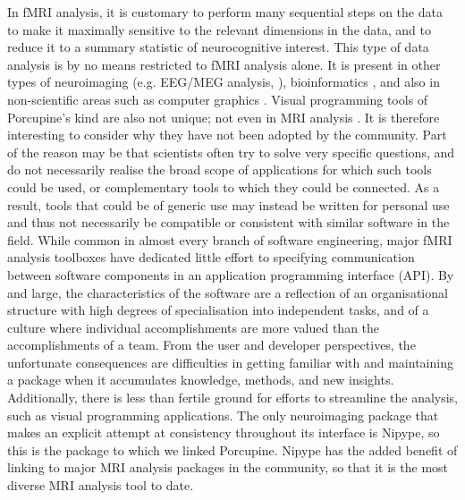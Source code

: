 In fMRI analysis, it is customary to perform many sequential steps on the data to make it maximally sensitive to the relevant dimensions in the data, and to reduce it to a summary statistic of neurocognitive interest. This type of data analysis is by no means restricted to fMRI analysis alone. It is present in other types of neuroimaging (e.g. EEG/MEG analysis, \cite{Oostenveld2011}), bioinformatics \cite{Wolstencroft2013}, and also in non-scientific areas such as computer graphics \cite{Blender}. Visual programming tools of Porcupine's kind are also not unique; not even in MRI analysis \cite{Lucas2010}. It is therefore interesting to consider why they have not been adopted by the community. Part of the reason may be that scientists often try to solve very specific questions, and do not necessarily realise the broad scope of applications for which such tools could be used, or complementary tools to which they could be connected. As a result, tools that could be of generic use may instead be written for personal use and thus not necessarily be compatible or consistent with similar software in the field. While common in almost every branch of software engineering, major fMRI analysis toolboxes have dedicated little effort to specifying communication between software components in an application programming interface (API). By and large, the characteristics of the software are a reflection of an organisational structure with high degrees of specialisation into independent tasks, and of a culture where individual accomplishments are more valued than the accomplishments of a team. From the user and developer perspectives, the unfortunate consequences are difficulties in getting familiar with and maintaining a package when it accumulates knowledge, methods, and new insights. Additionally, there is less than fertile ground for efforts to streamline the analysis, such as visual programming applications. The only neuroimaging package that makes an explicit attempt at consistency throughout its interface is Nipype, so this is the package to which we linked Porcupine. Nipype has the added benefit of linking to major MRI analysis packages in the community, so that it is the most diverse MRI analysis tool to date.


